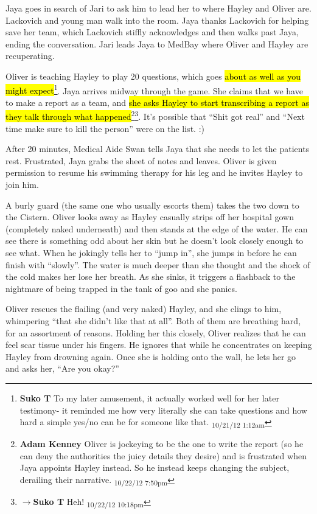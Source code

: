 Jaya goes in search of Jari to ask him to lead her to where Hayley and Oliver are.  Lackovich and young man walk into the room.  Jaya thanks Lackovich for helping save her team, which Lackovich stiffly acknowledges and then walks past Jaya, ending the conversation.  Jari leads Jaya to MedBay where Oliver and Hayley are recuperating.



Oliver is teaching Hayley to play 20 questions, which goes \hl{about as well as you might expect}\footnote{\textbf{Suko T }To my later amusement, it actually worked well for her later testimony- it reminded me how very literally she can take questions and how hard a simple yes/no can be for someone like that. \textsubscript{10/21/12 1:12am}}. Jaya arrives midway through the game.  She claims that we have to make a report as a team, and \hl{she asks Hayley to start transcribing a report as they talk through what happened}\footnote{\textbf{Adam Kenney }Oliver is jockeying to be the one to write the report (so he can deny the authorities the juicy details they desire) and is frustrated when Jaya appoints Hayley instead.  So he instead keeps changing the subject, derailing their narrative. \textsubscript{10/22/12 7:50pm}}\footnote{$\rightarrow$\textbf{Suko T }Heh! \textsubscript{10/22/12 10:18pm}}.  It's possible that ``Shit got real'' and ``Next time make sure to kill the person'' were on the list. :)



After 20 minutes, Medical Aide Swan tells Jaya that she needs to let the patients rest.  Frustrated, Jaya grabs the sheet of notes and leaves.  Oliver is given permission to resume his swimming therapy for his leg and he invites Hayley to join him.



A burly guard (the same one who usually escorts them) takes the two down to the Cistern.  Oliver looks away as Hayley casually strips off her hospital gown (completely naked underneath) and then stands at the edge of the water.  He can see there is something odd about her skin but he doesn't look closely enough to see what.  When he jokingly tells her to ``jump in'', she jumps in before he can finish with ``slowly''.  The water is much deeper than she thought and the shock of the cold makes her lose her breath.  As she sinks, it triggers a flashback to the nightmare of being trapped in the tank of goo and she panics.



Oliver rescues the flailing (and very naked) Hayley, and she clings to him, whimpering ``that she didn't like that at all''.  Both of them are breathing hard, for an assortment of reasons.  Holding her this closely, Oliver realizes that he can feel scar tissue under his fingers.  He ignores that while he concentrates on keeping Hayley from drowning again.  Once she is holding onto the wall, he lets her go and asks her, ``Are you okay?''



